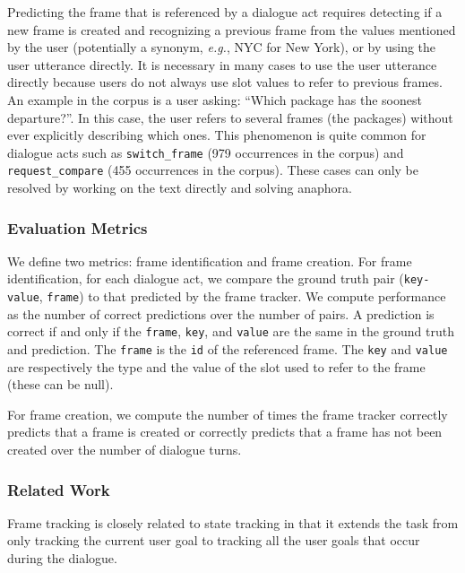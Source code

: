 \documentclass{article}
\theoremstyle{definition}
\begin{document}
Predicting the frame that is referenced by a dialogue act requires detecting if a new frame is created and recognizing a previous frame from the values mentioned by the user (potentially a synonym, \textit{e.g.}, NYC for New York), or by using the user utterance directly. It is necessary in many cases to use the user utterance directly because users do not always use slot values to refer to previous frames. An example in the corpus is a user asking: ``Which package has the soonest departure?''. In this case, the user refers to several frames (the packages) without ever explicitly describing which ones. This phenomenon is quite common for dialogue acts such as \texttt{switch\_frame} (979 occurrences in the corpus) and \texttt{request\_compare} (455 occurrences in the corpus). These cases can only be resolved by working on the text directly and solving anaphora.

\subsubsection{Evaluation Metrics}
\label{frameTrackEval}
We define two metrics: frame identification and frame creation. For frame identification, for each dialogue act, we compare the ground truth pair (\texttt{key-value}, \texttt{frame}) to that predicted by the frame tracker. We compute performance as the number of correct predictions over the number of pairs. A prediction is correct if and only if the \texttt{frame}, \texttt{key}, and \texttt{value} are the same in the ground truth and prediction. The \texttt{frame} is the \texttt{id} of the referenced frame. The \texttt{key} and \texttt{value} are respectively the type and the value of the slot used to refer to the frame (these can be null). 

For frame creation, we compute the number of times the frame tracker correctly predicts that a frame is created or correctly predicts that a frame has not been created over the number of dialogue turns.

\subsubsection{Related Work}
Frame tracking is closely related to state tracking in that it extends the task from only tracking the current user goal to tracking all the user goals that occur during the dialogue.
\end{document}
